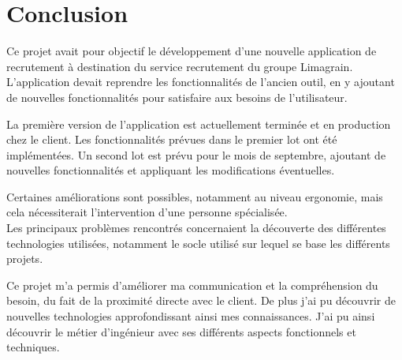 \cleardoublepage

\chapter*{Conclusion}




Ce projet avait pour objectif le développement d'une nouvelle application de recrutement à destination du service recrutement du groupe Limagrain.
L'application devait reprendre les fonctionnalités de l'ancien outil, en y ajoutant de nouvelles fonctionnalités pour satisfaire aux besoins de l'utilisateur.

La première version de l'application est actuellement terminée et en production chez le client.
Les fonctionnalités prévues dans le premier lot ont été implémentées.
Un second lot est prévu pour le mois de septembre, ajoutant de nouvelles fonctionnalités et appliquant les modifications éventuelles.

Certaines améliorations sont possibles, notamment au niveau ergonomie, mais cela nécessiterait l'intervention d'une personne spécialisée.
\\

Les principaux problèmes rencontrés concernaient la découverte des différentes technologies utilisées, notamment le socle utilisé sur lequel se base les différents projets.

Ce projet m'a permis d'améliorer ma communication et la compréhension du besoin, du fait de la proximité directe avec le client.
De plus j'ai pu découvrir de nouvelles technologies approfondissant ainsi mes connaissances.
J'ai pu ainsi découvrir le métier d'ingénieur avec ses différents aspects fonctionnels et techniques.
